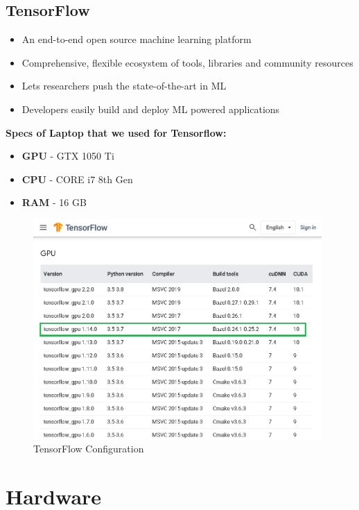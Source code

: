 
\subsection{TensorFlow}

\begin{itemize}
    \item An end-to-end open source machine learning platform
    \item Comprehensive, flexible ecosystem of tools, libraries and community resources
    \item Lets researchers push the state-of-the-art in ML
    \item Developers easily build and deploy ML powered applications
\end{itemize}

\textbf{Specs of Laptop that we used for Tensorflow: }
\begin{itemize}
    \item \textbf{GPU} - GTX 1050 Ti
    \item \textbf{CPU} - CORE i7 8th Gen
    \item \textbf{RAM} - 16 GB
\end{itemize}

\begin{figure}[H]
\centering
\includegraphics[width = 11cm]{project/images/tensorflow_version.png}
\caption{TensorFlow Configuration}
\end{figure}

\section{Hardware}

